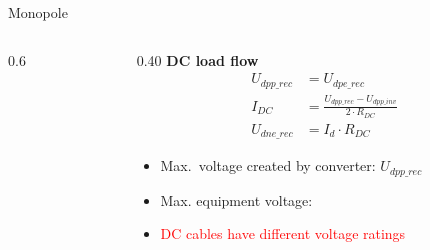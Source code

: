 \begin{frame}{Monopole}
  \begin{columns}[c,onlytextwidth]
    \begin{column}{0.6\textwidth}\centering
    \end{column}
    \begin{column}{0.40\textwidth}
      \textbf{DC load flow}
      \begin{align*}
        U_{dpp\_rec} &= U_{dpe\_rec}\\
        I_{DC} &= \tfrac{U_{dpp\_rec}-U_{dpp\_inv}}{2 \cdot R_{DC}}\\
        U_{dne\_rec} &= I_{d}\cdot R_{DC}
      \end{align*}
      \begin{itemize}
        \item Max.\ voltage created by converter: $U_{dpp\_rec}$
        \item Max. equipment voltage: 
        \item \textcolor{red}{DC cables have different voltage ratings}
      \end{itemize}
    \end{column}
  \end{columns}
\end{frame}

